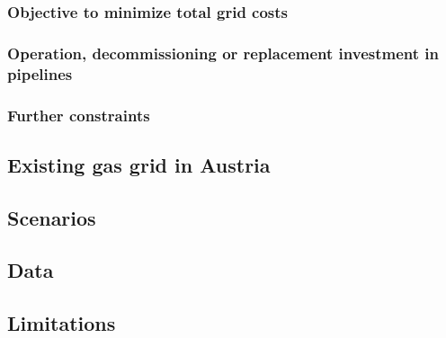  
 \subsubsection{Objective to minimize total grid costs}
 
 \subsubsection{Operation, decommissioning or replacement investment in pipelines}
 
 \subsubsection{Further constraints}
 
 

 

 
 
 

 \subsection{Existing gas grid in Austria}\label{gas_grid_austria}
 
 \subsection{Scenarios}\label{scenarios}
 
 \subsection{Data}\label{data}
 
 \subsection{Limitations}\label{limitations}
 

